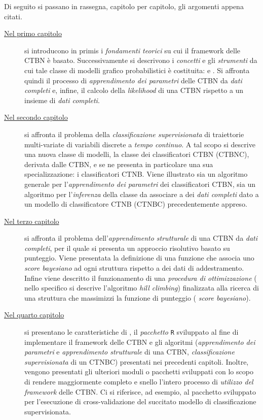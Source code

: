 Di seguito si passano in rassegna, capitolo per capitolo, gli argomenti appena citati.
\begin{description}
	\item[{\hyperref[cap:ctbn]{Nel primo capitolo}}]
	si introducono in primis i \emph{fondamenti teorici} su cui il framework delle \acf{CTBN} è basato. Successivamente si descrivono i \emph{concetti} e gli \emph{strumenti} da cui tale classe di modelli grafico probabilistici è costituita: \emph{\cim{}} e \emph{\stats{}}. Si affronta quindi il processo di \emph{apprendimento dei parametri} delle \acs{CTBN} da \emph{dati completi} e, infine, il calcolo della \emph{likelihood} di una \acs{CTBN} rispetto a un insieme di \emph{dati completi}.
	\item[{\hyperref[cap:ctbnc]{Nel secondo capitolo}}]
	si affronta il problema della \emph{classificazione supervisionata} di traiettorie multi-variate di variabili discrete a \emph{tempo continuo}. A tal scopo si descrive una nuova classe di modelli, la classe dei classificatori \acl{CTBN} (\acs{CTBNC}), derivata dalle \acs{CTBN}, e se ne presenta in particolare una sua specializzazione: i classificatori \acs{CTNB}. Viene illustrato sia un algoritmo generale per l'\emph{apprendimento dei parametri} dei classificatori \acs{CTBN}, sia un algoritmo per l'\emph{inferenza} della classe da associare a dei \emph{dati completi} dato a un modello di classificatore \acs{CTNB} (\acs{CTNBC}) precedentemente appreso.
	\item[{\hyperref[cap:structurallearning]{Nel terzo capitolo}}]
	si affronta il problema dell'\emph{apprendimento strutturale} di una \acs{CTBN} da \emph{dati completi}, per il quale si presenta un approccio risolutivo basato su punteggio. Viene presentata la definizione di una funzione che associa uno \emph{score bayesiano} ad ogni struttura rispetto a dei dati di addestramento. Infine viene descritto il funzionamento di una \emph{procedura di ottimizzazione} (\ie{} nello specifico si descrive l'algoritmo \emph{hill climbing}) finalizzata alla ricerca di una struttura che massimizzi la funzione di punteggio (\ie{} \emph{score bayesiano}).
	\item[{\hyperref[cap:ctbnr]{Nel quarto capitolo}}]
	si presentano le caratteristiche di , il \emph{pacchetto} \lstinline[]|R| sviluppato al fine di implementare il framework delle \acs{CTBN} e gli algoritmi (\emph{apprendimento dei parametri} e \emph{apprendimento strutturale} di una \acs{CTBN}, \emph{classificazione supervisionata} di un \acs{CTNBC}) presentati nei precedenti capitoli. Inoltre, vengono presentati gli ulteriori moduli o pacchetti sviluppati con lo scopo di rendere maggiormente completo e snello l'intero processo di \emph{utilizzo del framework} delle \acs{CTBN}. Ci si riferisce, ad esempio, al pacchetto sviluppato per l'esecuzione di cross-validazione del succitato modello di classificazione supervisionata.

\end{description}
